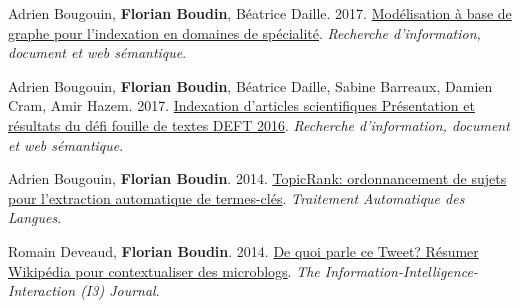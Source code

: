 \item 
Adrien Bougouin, \textbf{Florian Boudin}, Béatrice Daille.
2017.
\href{https://www.openscience.fr/IMG/pdf/iste_ridows17v1n2.pdf}{Modélisation à base de graphe pour l’indexation en domaines de spécialité}.
\textit{Recherche d’information, document et web sémantique}.
\label{bougouin-etal-2017-modelisation}

\item 
Adrien Bougouin, \textbf{Florian Boudin}, Béatrice Daille, Sabine Barreaux, Damien Cram, Amir Hazem.
2017.
\href{https://www.openscience.fr/IMG/pdf/iste_ridows17v1n3.pdf}{Indexation d’articles scientifiques Présentation et résultats du défi fouille de textes DEFT 2016}.
\textit{Recherche d’information, document et web sémantique}.
\label{bougouin-etal-2017-indexation}

\item
Adrien Bougouin, \textbf{Florian Boudin}.
2014.
\href{https://aclanthology.org/2014.tal-1.2.pdf}{TopicRank: ordonnancement de sujets pour l’extraction automatique de termes-clés}.
\textit{Traitement Automatique des Langues}.
\label{bougouin-boudin-2014-topicrank}

\item
Romain Deveaud, \textbf{Florian Boudin}.
2014.
\href{https://hal.science/hal-01096926/document}{De quoi parle ce Tweet? Résumer Wikipédia pour contextualiser des microblogs}.
\textit{The Information-Intelligence-Interaction (I3) Journal}.
\label{deveaud-boudin-2014-quoi}